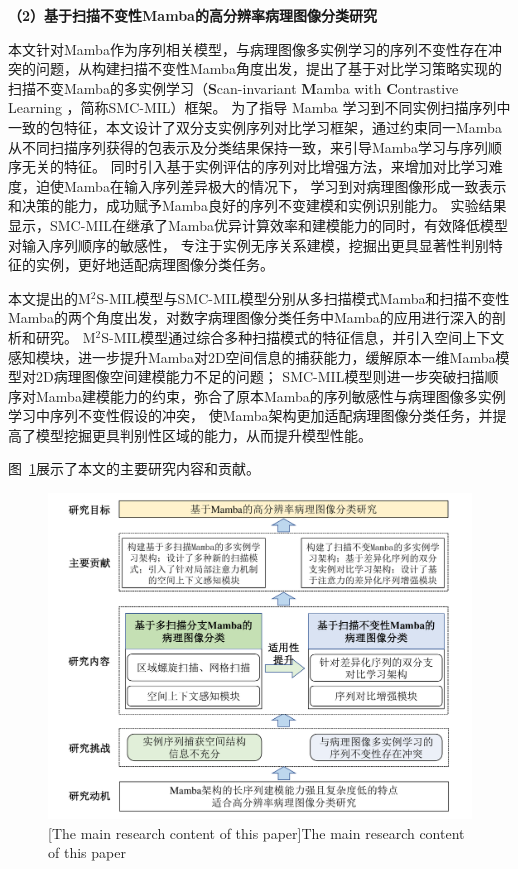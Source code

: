 \textbf{（2）基于扫描不变性Mamba的高分辨率病理图像分类研究}

本文针对Mamba作为序列相关模型，与病理图像多实例学习的序列不变性存在冲突的问题，从构建扫描不变性Mamba角度出发，提出了基于对比学习策略实现的扫描不变Mamba的多实例学习（\textbf{S}can-invariant \textbf{M}amba with \textbf{C}ontrastive Learning ，简称SMC-MIL）框架。
为了指导 Mamba 学习到不同实例扫描序列中一致的包特征，本文设计了双分支实例序列对比学习框架，通过约束同一Mamba从不同扫描序列获得的包表示及分类结果保持一致，来引导Mamba学习与序列顺序无关的特征。
同时引入基于实例评估的序列对比增强方法，来增加对比学习难度，迫使Mamba在输入序列差异极大的情况下，
学习到对病理图像形成一致表示和决策的能力，成功赋予Mamba良好的序列不变建模和实例识别能力。
实验结果显示，SMC-MIL在继承了Mamba优异计算效率和建模能力的同时，有效降低模型对输入序列顺序的敏感性，
专注于实例无序关系建模，挖掘出更具显著性判别特征的实例，更好地适配病理图像分类任务。

本文提出的M$^2$S-MIL模型与SMC-MIL模型分别从多扫描模式Mamba和扫描不变性Mamba的两个角度出发，对数字病理图像分类任务中Mamba的应用进行深入的剖析和研究。
M$^2$S-MIL模型通过综合多种扫描模式的特征信息，并引入空间上下文感知模块，进一步提升Mamba对2D空间信息的捕获能力，缓解原本一维Mamba模型对2D病理图像空间建模能力不足的问题；
SMC-MIL模型则进一步突破扫描顺序对Mamba建模能力的约束，弥合了原本Mamba的序列敏感性与病理图像多实例学习中序列不变性假设的冲突，
使Mamba架构更加适配病理图像分类任务，并提高了模型挖掘更具判别性区域的能力，从而提升模型性能。

图~\ref{figure1: 主要研究内容}展示了本文的主要研究内容和贡献。

\begin{figure}[h]
    \centering
    \includegraphics[width=1.0\columnwidth]{figures/研究内容.pdf}
    [The main research content of this paper]{The main research content of this paper}
    \label{figure1: 主要研究内容}
\end{figure}

